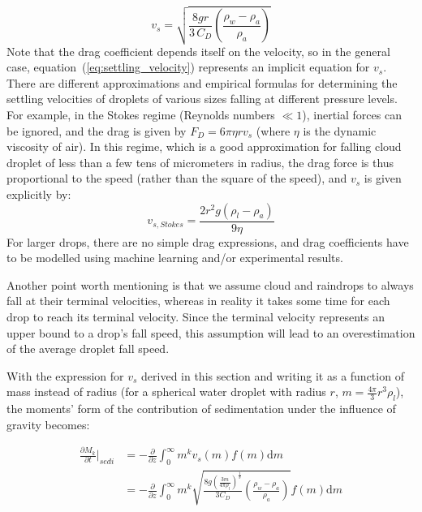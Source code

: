 \documentclass{report}
\begin{document}
\begin{equation}
    v_s = \sqrt{\frac{8 g r}{3 \, C_{D}} \left( \frac{\rho_{w} - \rho_a}{\rho_a} \right)}
\label{eq:settling_velocity}
\end{equation}
Note that the drag coefficient depends itself on the velocity, so in the general case, equation~(\ref{eq:settling_velocity}) represents an implicit equation for $v_s$. There are different approximations and empirical formulas for determining the settling velocities of droplets of various sizes falling at different pressure levels. For example, in the Stokes regime (Reynolds numbers $\ll 1$), inertial forces can be ignored, and the drag is given by $F_D = 6 \pi \eta r v_s$ (where $\eta$ is the dynamic viscosity of air). In this regime, which is a good approximation for falling cloud droplet of less than a few tens of micrometers in radius, the drag force is thus  proportional to the speed (rather than the square of the speed), and $v_s$ is given explicitly by:
\begin{equation}
    v_{s, Stokes} = \frac{2 r^2 g (\rho_l - \rho_a)}{9 \eta}
\label{eq:settling_velocity_stokes}
\end{equation}
For larger drops, there are no simple drag expressions, and drag coefficients have to be modelled using machine learning and/or experimental results.

Another point worth mentioning is that we assume cloud and raindrops to always fall at their terminal velocities, whereas in reality it takes some time for each drop to reach its terminal velocity. Since the terminal velocity represents an upper bound to a drop's fall speed, this assumption will lead to an overestimation of the average droplet fall speed.

With the expression for $v_s$ derived in this section and writing it as a function of mass instead of radius (for a spherical water droplet with radius $r$, $m = \frac{4 \pi}{3} r^3 \rho_l$), the moments' form of the contribution of sedimentation under the influence of gravity becomes:

\begin{equation}
\begin{aligned}
    \frac{\partial M_k}{\partial t} \biggr\rvert_{sedi} &= -\frac{\partial}{\partial z}\int_0^\infty m^k v_s(m) f(m) \text{d}m \\
                                                        &= -\frac{\partial}{\partial z}\int_0^\infty m^k \sqrt{\frac{8 g \left(\frac{3 m}{4 \pi \rho_l}\right)^{\frac{1}{3}}}{3 C_{D}} \left( \frac{\rho_{w} - \rho_a}{\rho_a} \right)} f(m) \text{d}m
\end{aligned}
\label{eq:sedimentation_moments}
\end{equation}
\end{document}
